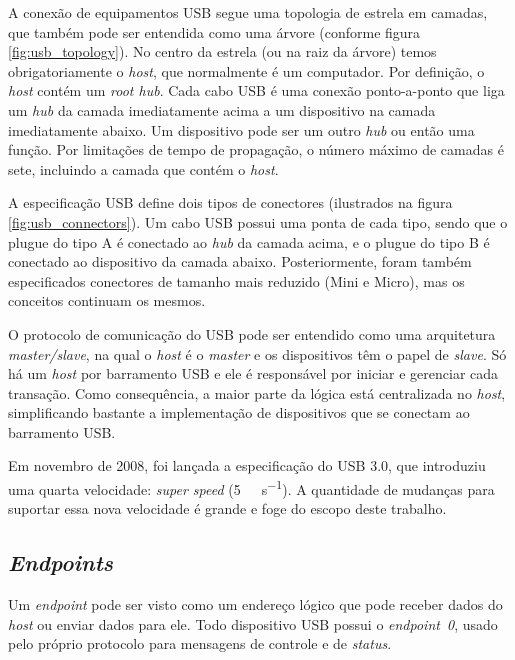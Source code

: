 \documentclass[brazil,pagestart=firstchapter]{abnt}
\begin{document}
A conexão de equipamentos \ac{USB} segue uma topologia de estrela em
camadas, que também pode ser entendida como uma árvore (conforme figura
\ref{fig:usb_topology}). No centro da estrela (ou na raiz da árvore) temos
obrigatoriamente o \textit{host}, que normalmente é um computador. Por
definição, o \textit{host} contém um \textit{root hub}. Cada cabo \ac{USB} é
uma conexão ponto-a-ponto que liga um \textit{hub} da camada imediatamente
acima a um dispositivo na camada imediatamente abaixo. Um dispositivo pode
ser um outro \textit{hub} ou então uma função. Por limitações de tempo de
propagação, o número máximo de camadas é sete, incluindo a camada que contém
o \textit{host}.  \cite[p.~16]{usb20}

A especificação \ac{USB} define dois tipos de conectores (ilustrados na
figura \ref{fig:usb_connectors}). Um cabo \ac{USB} possui uma ponta de cada
tipo, sendo que o plugue do tipo A é conectado ao \textit{hub} da camada
acima, e o plugue do tipo B é conectado ao dispositivo da camada abaixo.
Posteriormente, foram também especificados conectores de tamanho mais
reduzido (Mini e Micro), mas os conceitos continuam os mesmos.

O protocolo de comunicação do \ac{USB} pode ser entendido como uma
arquitetura \textit{master/slave}, na qual o \textit{host} é o
\textit{master} e os dispositivos têm o papel de \textit{slave}. Só há um
\textit{host} por barramento \ac{USB} e ele é responsável por iniciar e
gerenciar cada transação. Como consequência, a maior parte da lógica está
centralizada no \textit{host}, simplificando bastante a implementação de
dispositivos que se conectam ao barramento \ac{USB}. \cite{usbinanutshell}

Em novembro de 2008, foi lançada a especificação do USB 3.0, que introduziu
uma quarta velocidade: \textit{super speed} (\SI{5}{\giga\bit\per\second}).
A quantidade de mudanças para suportar essa nova velocidade é grande e foge
do escopo deste trabalho.


\subsection{\textit{Endpoints}}
\label{sub:usb_endpoints}

Um \textit{endpoint} pode ser visto como um endereço lógico que pode receber
dados do \textit{host} ou enviar dados para ele. Todo dispositivo \ac{USB}
possui o \textit{endpoint~0}, usado pelo próprio protocolo para mensagens de
controle e de \textit{status}. \cite[cap.~3]{usbinanutshell}
\end{document}
